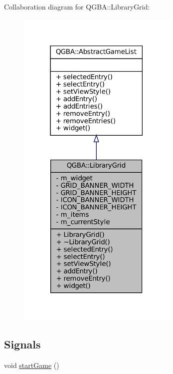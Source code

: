 Collaboration diagram for Q\+G\+BA\+:\+:Library\+Grid\+:
\nopagebreak
\begin{figure}[H]
\begin{center}
\leavevmode
\includegraphics[width=218pt]{class_q_g_b_a_1_1_library_grid__coll__graph}
\end{center}
\end{figure}
\subsection*{Signals}
\begin{DoxyCompactItemize}
\item 
void \mbox{\hyperlink{class_q_g_b_a_1_1_library_grid_af22adb696b19fda67d06fbc9f562d1c9}{start\+Game}} ()
\end{DoxyCompactItemize}
